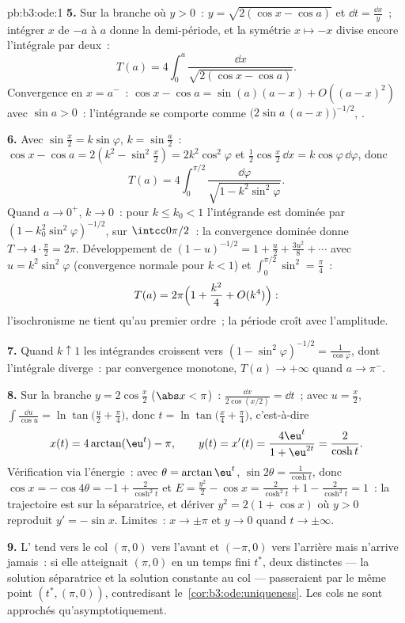 \begin{solution}{pb:b3:ode:1}
\textbf{5.} Sur la branche où $y > 0$~: $y = \sqrt{2(\cos x
- \cos a)}$ et $\dd t = \frac{\dd x}{y}$~; intégrer $x$ de
$-a$ à $a$ donne la demi-période, et la symétrie $x \mapsto
-x$ divise encore l'intégrale par deux~:
\[
T(a) = 4\int_0^a\frac{\dd x}{\sqrt{2(\cos x - \cos a)}} .
\]
Convergence en $x = a^-$~: $\cos x - \cos a = \sin(a)(a - x)
+ O((a-x)^2)$ avec $\sin a > 0$~: l'intégrande se comporte
comme $\bigl(2\sin a\,(a - x)\bigr)^{-1/2}$, .

\textbf{6.} Avec $\sin\frac x2 = k\sin\varphi$, $k =
\sin\frac a2$~: $\cos x - \cos a = 2(k^2 - \sin^2\frac x2)
= 2k^2\cos^2\varphi$ et $\frac12\cos\frac x2\,\dd x =
k\cos\varphi\,\dd\varphi$, donc
\[
T(a) = 4\int_0^{\pi/2}
\frac{\dd\varphi}{\sqrt{1 - k^2\sin^2\varphi}} .
\]
Quand $a \to 0^+$, $k \to 0$~: pour $k \leq k_0 < 1$
l'intégrande est dominée par $(1 -
k_0^2\sin^2\varphi)^{-1/2}$,  sur $\intcc0{\pi/2}$~:
la convergence dominée donne $T \to 4\cdot\frac\pi2 =
2\pi$. Développement de $(1 - u)^{-1/2} = 1 + \frac u2 +
\frac{3u^2}8 + \cdots$ avec $u = k^2\sin^2\varphi$
(convergence normale pour $k < 1$) et
$\int_0^{\pi/2}\sin^2 = \frac\pi4$~:
\[
T(a) = 2\pi\Bigl(1 + \frac{k^2}{4} + O(k^4)\Bigr) :
\]
l'isochronisme ne tient qu'au premier ordre~; la période croît
avec l'amplitude.

\textbf{7.} Quand $k \uparrow 1$ les intégrandes croissent
vers $(1 - \sin^2\varphi)^{-1/2} = \frac1{\cos\varphi}$,
dont l'intégrale diverge~: par convergence monotone, $T(a)
\to +\infty$ quand $a \to \pi^-$.

\textbf{8.} Sur la branche $y = 2\cos\frac x2$ ($\abs x <
\pi$)~: $\frac{\dd x}{2\cos(x/2)} = \dd t$~; avec $u =
\frac x2$, $\int\frac{\dd u}{\cos u} =
\ln\tan\bigl(\frac u2 + \frac\pi4\bigr)$, donc $t =
\ln\tan\bigl(\frac x4 + \frac\pi4\bigr)$, c'est-à-dire
\[
x(t) = 4\arctan(\eu^t) - \pi,
\qquad y(t) = x'(t) = \frac{4\eu^t}{1 + \eu^{2t}} =
\frac{2}{\cosh t} .
\]
Vérification via l'énergie~: avec $\theta = \arctan\eu^t$,
$\sin2\theta = \frac1{\cosh t}$, donc $\cos x = -\cos4\theta
= -1 + \frac{2}{\cosh^2t}$ et $E = \frac{y^2}2 - \cos x =
\frac2{\cosh^2t} + 1 - \frac2{\cosh^2t} = 1$~: la
trajectoire est sur la séparatrice, et dériver $y^2 = 2(1 +
\cos x)$ où $y > 0$ reproduit $y' = -\sin x$. Limites~: $x
\to \pm\pi$ et $y \to 0$ quand $t \to \pm\infty$.

\textbf{9.} L' tend vers le col $(\pi, 0)$ vers
l'avant et $(-\pi, 0)$ vers l'arrière mais n'arrive jamais~:
si elle atteignait $(\pi, 0)$ en un temps fini $t^*$, deux
 distinctes --- la solution séparatrice et
la solution constante au col --- passeraient par le même
point $(t^*, (\pi, 0))$, contredisant
le~\cref{cor:b3:ode:uniqueness}. Les cols ne sont approchés
qu'asymptotiquement.


\end{solution}
